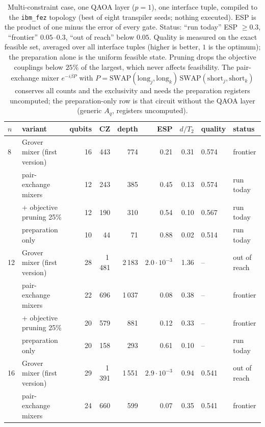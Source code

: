 \begin{table}[t]
\centering\footnotesize\setlength{\tabcolsep}{4pt}
\caption{ Multi-constraint case, one QAOA layer ($p=1$), one interface tuple, compiled to the \texttt{ibm\_fez} topology (best of eight transpiler seeds; nothing executed). ESP is the product of one minus the error of every gate. Status: ``run today'' ESP $\ge0.3$, ``frontier'' $0.05$--$0.3$, ``out of reach'' below $0.05$. Quality is measured on the exact feasible set, averaged over all interface tuples (higher is better, $1$ is the optimum); the preparation alone is the uniform feasible state. Pruning drops the objective couplings below $25\%$ of the largest, which never affects feasibility. The pair-exchange mixer $e^{-i\beta P}$ with $P=\mathrm{SWAP}(\mathrm{long}_j,\mathrm{long}_k)\,\mathrm{SWAP}(\mathrm{short}_j,\mathrm{short}_k)$ conserves all counts and the exclusivity and needs the preparation registers uncomputed; the preparation-only row is that circuit without the QAOA layer (generic $A_q$, registers uncomputed).}\label{tab:large_qaoa_real}
\begin{tabular}{llrrrrrll}
\toprule
$n$ & variant & qubits & CZ & depth & ESP & $d/T_2$ & quality & status\\
\midrule
8 & Grover mixer (first version) & 16 & 443 & 774 & 0.21 & 0.31 & 0.574 & frontier\\
 & pair-exchange mixers & 12 & 243 & 385 & 0.45 & 0.13 & 0.574 & run today\\
 & \quad + objective pruning 25\% & 12 & 190 & 310 & 0.54 & 0.10 & 0.567 & run today\\
 & preparation only & 10 & 44 & 71 & 0.88 & 0.02 & 0.514 & run today\\
\midrule
12 & Grover mixer (first version) & 28 & 1\,481 & 2\,183 & $2.0\!\cdot\!10^{-3}$ & 1.36 & -- & out of reach\\
 & pair-exchange mixers & 22 & 696 & 1\,037 & 0.08 & 0.38 & -- & frontier\\
 & \quad + objective pruning 25\% & 20 & 579 & 881 & 0.12 & 0.33 & -- & frontier\\
 & preparation only & 20 & 158 & 293 & 0.61 & 0.10 & -- & run today\\
\midrule
16 & Grover mixer (first version) & 29 & 1\,391 & 1\,551 & $2.9\!\cdot\!10^{-3}$ & 0.94 & 0.541 & out of reach\\
 & pair-exchange mixers & 24 & 660 & 599 & 0.07 & 0.35 & 0.541 & frontier\\

\end{tabular}
\end{table}
